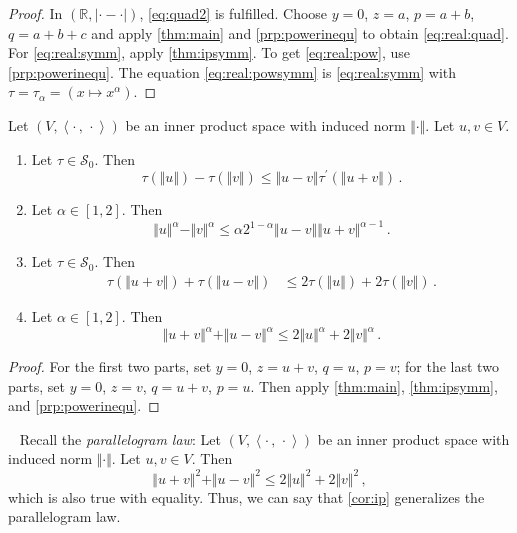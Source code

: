 \documentclass{article}
\newcommand{\abs}[1]{\left| #1 \right|} %
\newcommand*{\mc}[1]{\mathcal{#1}}
\newcommand{\R}{\mathbb{R}}
\newcommand{\pr}{^\prime}
\newcommand{\innerProduct}[2]{\left\langle#1\,,\, #2\right\rangle}
\newcommand{\ip}[2]{\innerProduct{#1}{#2}}
\newcommand{\normof}[1]{\Vert #1 \Vert}
\newcommand{\equationFullstop}{\, .}
\newcommand{\eqfs}{\equationFullstop}
\newcommand{\equationComma}{\, ,}
\newcommand{\eqcm}{\equationComma}
\newcommand{\tran}{\tau}
\newcommand{\dtran}{\tran\pr}
\newcommand{\setcco}{\mc S_0}
\begin{document}
%
\begin{proof}
	In $(\R, \abs{\cdot - \cdot})$, \eqref{eq:quad2} is fulfilled. Choose $y = 0$, $z = a$, $p = a+b$, $q=a+b+c$ and apply \cref{thm:main} and \cref{prp:powerinequ} to obtain \eqref{eq:real:quad}. For \eqref{eq:real:symm}, apply \cref{thm:ipsymm}. To get \eqref{eq:real:pow}, use \cref{prp:powerinequ}. The equation \eqref{eq:real:powsymm} is \eqref{eq:real:symm} with $\tran = \tran_\alpha = (x\mapsto x^\alpha)$.
\end{proof}
%
\begin{corollary}\label{cor:ip}
	Let $(V, \ip{\cdot}{\cdot})$ be an inner product space with induced norm $\normof{\cdot}$. Let $u, v \in V$.
	\begin{enumerate}[label=(\roman*)]
		\item\label{cor:ip:a:tran} Let $\tran\in\setcco$. Then
		\begin{equation}
			\tran(\normof{u}) - \tran(\normof{v})
			\leq \normof{u-v} \dtran(\normof{u+v}) 
			\eqfs
		\end{equation}
		\item\label{cor:ip:a:pow} Let $\alpha\in[1,2]$. Then
		\begin{equation}
			\normof{u}^\alpha - \normof{v}^\alpha
			\leq \alpha 2^{1-\alpha}  \normof{u-v} \normof{u+v}^{\alpha-1}
			\eqfs
		\end{equation}
		\item\label{cor:ip:b:tran} Let $\tran\in\setcco$. Then
		\begin{align}
			\tran(\normof{u+v}) + \tran(\normof{u-v}) &\leq  2 \tran(\normof{u}) + 2 \tran(\normof{v}) 
			\eqfs
		\end{align}
		\item\label{cor:ip:b:pow} Let $\alpha\in[1,2]$. Then
		\begin{equation}
			\normof{u+v}^\alpha + \normof{u-v}^\alpha
			\leq 2 \normof{u}^\alpha + 2 \normof{v}^\alpha
			\eqfs
		\end{equation}
	\end{enumerate}
\end{corollary}
%
\begin{proof}
	For the first two parts, set $y = 0$, $z = u+v$, $q = u$, $p = v$; for the last two parts, set $y = 0$, $z = v$, $q = u+v$, $p = u$. Then apply \cref{thm:main}, \cref{thm:ipsymm}, and \cref{prp:powerinequ}.
\end{proof}
%
\begin{remark}\label{rem:subopti:euclid}\mbox{ }
	Recall the \textit{parallelogram law}: Let $(V, \ip{\cdot}{\cdot})$ be an inner product space with induced norm $\normof{\cdot}$. Let $u, v \in V$. Then
	\begin{equation}
		\normof{u+v}^2 + \normof{u-v}^2 \leq 2 \normof{u}^2 + 2\normof{v}^2\eqcm
	\end{equation}
	which is also true with equality.
	Thus, we can say that \cref{cor:ip} generalizes the parallelogram law.
\end{remark}
%
%
%
\end{document}
